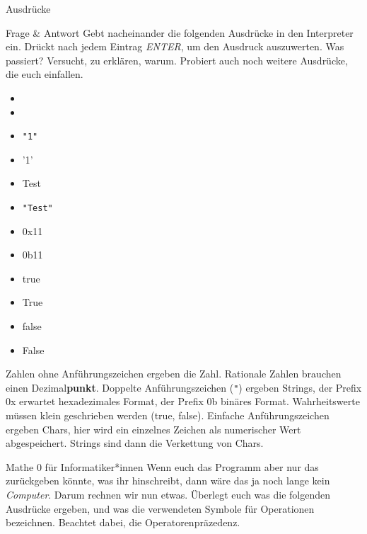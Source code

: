 \begin{task}[points=auto]{Ausdrücke }
    \begin{subtask*}[points=0]{Frage \& Antwort}
        Gebt nacheinander die folgenden Ausdrücke in den Interpreter ein. Drückt nach
        jedem Eintrag \textit{ENTER}, um den Ausdruck auszuwerten. Was passiert?
        Versucht, zu erklären, warum. Probiert auch noch weitere Ausdrücke, die euch
        einfallen.

        \begin{multicols}{3}
            \begin{itemize}
                \item {}
                \item {}
                \item {\ttfamily \verb="1"=}
                \item {\ttfamily '1'}
                \item {\ttfamily Test}
                \item {\ttfamily \verb="Test"=}
                \item {\ttfamily 0x11}
                \item {\ttfamily 0b11}
                \item {\ttfamily true}
                \item {\ttfamily True}
                \item {\ttfamily false}
                \item {\ttfamily False}
            \end{itemize}
        \end{multicols}


        \begin{solution}
            Zahlen ohne Anführungszeichen ergeben die Zahl. Rationale Zahlen brauchen einen
            Dezimal\textbf{punkt}. Doppelte Anführungszeichen ({\ttfamily \verb+"+}) ergeben Strings,
            der Prefix {\ttfamily 0x} erwartet hexadezimales Format, der Prefix {\ttfamily 0b}
            binäres Format. Wahrheitswerte müssen klein geschrieben werden ({\ttfamily true},
            {\ttfamily false}).
            Einfache Anführungszeichen ergeben Chars, hier wird ein einzelnes Zeichen als numerischer Wert abgespeichert.
            Strings sind dann die Verkettung von Chars.
        \end{solution}
    \end{subtask*}
    \begin{subtask*}[points=0]{Mathe 0 für Informatiker*innen}
        Wenn euch das Programm aber nur das zurückgeben könnte, was ihr hinschreibt,
        dann wäre das ja noch lange kein \textit{Computer}. Darum rechnen wir nun etwas.
        Überlegt euch was die folgenden Ausdrücke ergeben, und was die verwendeten
        Symbole für Operationen bezeichnen. Beachtet dabei, die Operatorenpräzedenz.


\end{subtask*}
\end{task}

